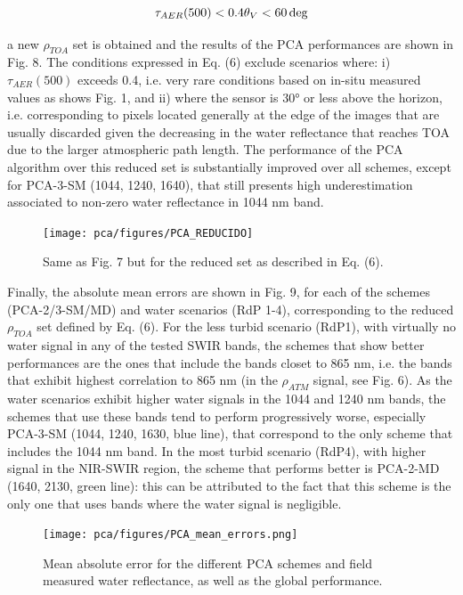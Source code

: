 \begin{equation}
\tau_{AER}(500) < 0.4\\
\theta_{V}<60\deg
\end{equation}

a new $\rho_{TOA}$ set is obtained and the results of the PCA performances are shown in Fig. 8. The conditions expressed in Eq. (6) exclude scenarios where: i) $\tau_{AER}(500)$ exceeds 0.4, i.e. very rare conditions based on in-situ measured values as shows Fig. 1, and ii) where the sensor is 30° or less above the horizon, i.e. corresponding to pixels located generally at the edge of the images that are usually discarded given the decreasing in the water reflectance that reaches TOA due to the larger atmospheric path length. The performance of the PCA algorithm over this reduced set is substantially improved over all schemes, except for PCA-3-SM (1044, 1240, 1640), that still presents high underestimation associated to non-zero water reflectance in 1044 nm band. 


\begin{figure}
\centering
\texttt{[image: pca/figures/PCA\_REDUCIDO]}
\caption{Same as Fig. 7 but for the reduced set as described in Eq. (6).}
\label{pca:pca_reducido}
\end{figure}

Finally, the absolute mean errors are shown in Fig. 9, for each of the schemes (PCA-2/3-SM/MD) and water scenarios (RdP 1-4), corresponding to the reduced $\rho_{TOA}$ set defined by Eq. (6). For the less turbid scenario (RdP1), with virtually no water signal in any of the tested SWIR bands, the schemes that show better performances are the ones that include the bands closet to 865 nm, i.e. the bands that exhibit highest correlation to 865 nm (in the $\rho_{ATM}$ signal, see Fig. 6). As the water scenarios exhibit higher water signals in the 1044 and 1240 nm bands, the schemes that use these bands tend to perform progressively worse, especially PCA-3-SM (1044, 1240, 1630, blue line), that correspond to the only scheme that includes the 1044 nm band. In the most turbid scenario (RdP4), with higher signal in the NIR-SWIR region, the scheme that performs better is PCA-2-MD (1640, 2130, green line): this can be attributed to the fact that this scheme is the only one that uses bands where the water signal is negligible.

\begin{figure}
\centering
\texttt{[image: pca/figures/PCA\_mean\_errors.png]}
\caption{Mean absolute error for the different PCA schemes and field measured water reflectance, as well as the global performance.}
\label{pca:pca_mean_errors}
\end{figure}

